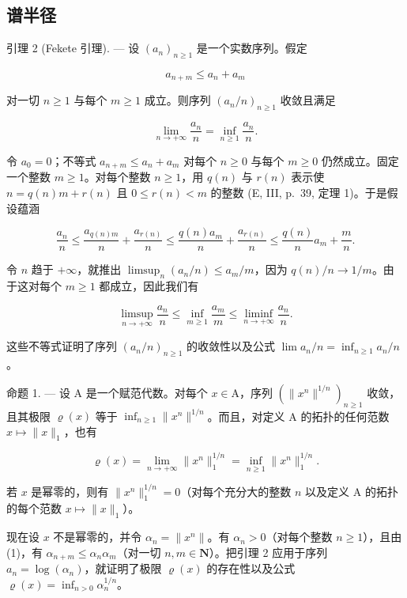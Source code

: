 \subsection{谱半径}

引理 2 (Fekete 引理). --- 设 \((a_{n})_{n\geqslant1}\) 是一个实数序列。假定

\[
a _ {n + m} \leqslant a _ {n} + a _ {m}
\]

对一切 \(n \geqslant 1\) 与每个 \(m \geqslant 1\) 成立。则序列 \((a_n / n)_{n \geqslant 1}\) 收敛且满足

\[
\lim _ {n \to + \infty} \frac {a _ {n}}{n} = \inf _ {n \geqslant 1} \frac {a _ {n}}{n}.
\]

令 \(a_0 = 0\)；不等式 \(a_{n+m} \leqslant a_n + a_m\) 对每个 \(n \geqslant 0\) 与每个 \(m \geqslant 0\) 仍然成立。固定一个整数 \(m \geqslant 1\)。对每个整数 \(n \geqslant 1\)，用 \(q(n)\) 与 \(r(n)\) 表示使 \(n = q(n)m + r(n)\) 且 \(0 \leqslant r(n) < m\) 的整数 (E, III, p.~39, 定理 1)。于是假设蕴涵

\[
\frac {a _ {n}}{n} \leqslant \frac {a _ {q (n) m}}{n} + \frac {a _ {r (n)}}{n} \leqslant \frac {q (n) a _ {m}}{n} + \frac {a _ {r (n)}}{n} \leqslant \frac {q (n)}{n} a _ {m} + \frac {m}{n}.
\]

令 \(n\) 趋于 \(+\infty\)，就推出 \(\limsup_{n}(a_{n}/n) \leqslant a_{m}/m\)，因为 \(q(n)/n \to 1/m\)。由于这对每个 \(m \geqslant 1\) 都成立，因此我们有

\[
\limsup _ {n \to + \infty} \frac {a _ {n}}{n} \leqslant \inf _ {m \geqslant 1} \frac {a _ {m}}{m} \leqslant \liminf _ {n \to + \infty} \frac {a _ {n}}{n}.
\]

这些不等式证明了序列 \((a_{n}/n)_{n\geqslant1}\) 的收敛性以及公式 \(\lim a_{n}/n = \inf_{n\geqslant1} a_{n}/n\)。

命题 1. --- 设 A 是一个赋范代数。对每个 \(x \in \mathrm{A}\)，序列 \((\|x^n\|^{1/n})_{n \geqslant 1}\) 收敛，且其极限 \(\varrho(x)\) 等于 \(\inf_{n \geqslant 1} \|x^n\|^{1/n}\)。而且，对定义 A 的拓扑的任何范数 \(x \mapsto \|x\|_1\)，也有

\[
\varrho (x) = \lim _ {n \to + \infty} \| x ^ {n} \| _ {1} ^ {1 / n} = \inf _ {n \geqslant 1} \| x ^ {n} \| _ {1} ^ {1 / n}.
\]

若 \(x\) 是幂零的，则有 \(\| x^n\| _1^{1 / n} = 0\)（对每个充分大的整数 \(n\) 以及定义 A 的拓扑的每个范数 \(x\mapsto \| x\| _1\)）。

现在设 \(x\) 不是幂零的，并令 \(\alpha_{n} = \| x^{n}\|\)。有 \(\alpha_{n} > 0\)（对每个整数 \(n \geqslant 1\)），且由 (1)，有 \(\alpha_{n + m} \leqslant \alpha_{n}\alpha_{m}\)（对一切 \(n, m \in \mathbf{N}\)）。把引理 2 应用于序列 \(a_n = \log(\alpha_n)\)，就证明了极限 \(\varrho(x)\) 的存在性以及公式 \(\varrho(x) = \inf_{n > 0} \alpha_n^{1/n}\)。

